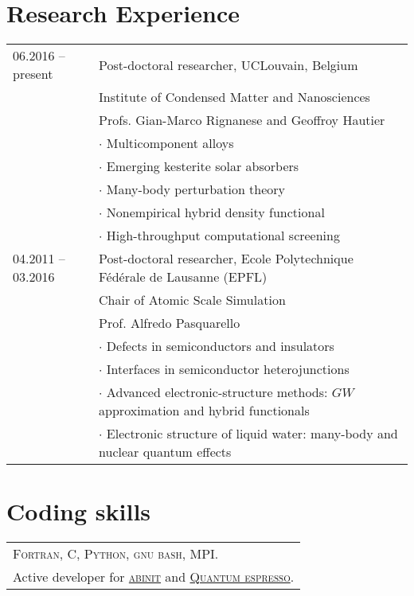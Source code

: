\documentclass[a4paper, 11pt, DIV=15, headings=normal]{scrartcl}
\begin{document}
\section*{Research Experience}
\begin{tabular}{ll}
06.2016 -- present & Post-doctoral researcher, UCLouvain, Belgium \\
                   & Institute of Condensed Matter and Nanosciences\\ 
                   & Profs. Gian-Marco Rignanese and Geoffroy Hautier  \\
                   & $\cdot$ Multicomponent alloys \\
                   & $\cdot$ Emerging kesterite solar absorbers \\
                   & $\cdot$ Many-body perturbation theory \\
                   & $\cdot$ Nonempirical hybrid density functional \\
                   & $\cdot$ High-throughput computational screening \\
                
04.2011 -- 03.2016 & Post-doctoral researcher, Ecole Polytechnique F\'{e}d\'{e}rale de Lausanne (EPFL) \\
                   & Chair of Atomic Scale Simulation  \\
                   & Prof. Alfredo Pasquarello \\
                   & $\cdot$ Defects in semiconductors and insulators \\
                   & $\cdot$ Interfaces in semiconductor heterojunctions  \\
                   & $\cdot$ Advanced electronic-structure methods: $GW$ approximation and hybrid functionals \\
                   & $\cdot$ Electronic structure of liquid water: many-body and nuclear quantum effects
\end{tabular}

\section*{Coding skills}
\begin{tabular}{l}
\textsc{Fortran}, \textsc{C}, \textsc{Python}, \textsc{gnu bash}, \textsc{MPI}. \\
Active developer for \href{http://www.abinit.org}{\textsc{abinit}} and 
\href{http://www.quantum-espresso.org}{\textsc{Quantum espresso}}. \\
\end{tabular}
\end{document}
